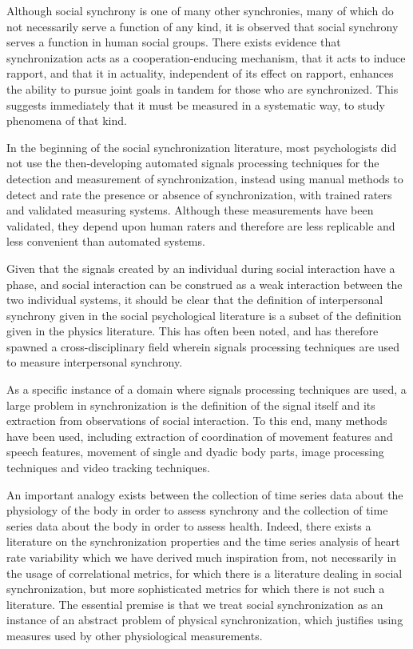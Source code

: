 \documentclass[12pt]{article}
\begin{document}
Although social synchrony is one of many other synchronies, many of which do not necessarily serve a function of any kind, it is observed that social synchrony serves a function in human social groups. There exists evidence that synchronization acts as a cooperation-enducing mechanism\cite{coop}, that it acts to induce rapport\cite{rapport}, and that it in actuality, independent of its effect on rapport, enhances the ability to pursue joint goals in tandem for those who are synchronized\cite{goals}. This suggests immediately that it must be measured in a systematic way, to study phenomena of that kind.

In the beginning of the social synchronization literature, most psychologists did not use the then-developing automated signals processing techniques for the detection and measurement of synchronization, instead using manual methods to detect and rate the presence or absence of synchronization, with trained raters and validated measuring systems\cite{manual}. Although these measurements have been validated\cite{manualval}, they depend upon human raters and therefore are less replicable and less convenient than automated systems.

Given that the signals created by an individual during social interaction have a phase, and social interaction can be construed as a weak interaction between the two individual systems, it should be clear that the definition of interpersonal synchrony given in the social psychological literature is a subset of the definition given in the physics literature. This has often been noted\cite{socialsync}, and has therefore spawned a cross-disciplinary field wherein signals processing techniques are used to measure interpersonal synchrony.

As a specific instance of a domain where signals processing techniques are used, a large problem in synchronization is the definition of the signal itself and its extraction from observations of social interaction. To this end, many methods have been used, including extraction of coordination of movement features and speech features, movement of single and dyadic body parts, image processing techniques and video tracking techniques. %

An important analogy exists between the collection of time series data about the physiology of the body in order to assess synchrony and the collection of time series data about the body in order to assess health. Indeed, there exists a literature on the synchronization properties and the time series analysis of heart rate variability which we have derived much inspiration from, not necessarily in the usage of correlational metrics, for which there is a literature dealing in social synchronization, but more sophisticated metrics for which there is not such a literature\cite{hrv1}\cite{hrv2}. The essential premise is that we treat social synchronization as an instance of an abstract problem of physical synchronization, which justifies using measures used by other physiological measurements.
\end{document}
